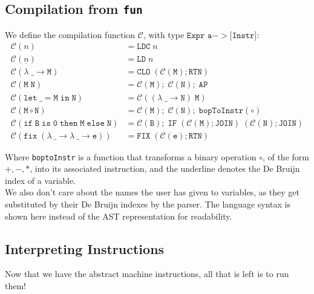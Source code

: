 \subsection{Compilation from \texttt{fun}}
We define the compilation function $ \mathcal{C} $, with type $ \texttt{Expr a} -> \texttt{[Instr]} $:
\[
\begin{aligned}
    \mathcal{C}(n) &= \mathtt{LDC}\; n \\
    \mathcal{C}(\underline{n}) &= \mathtt{LD}\; n \\
    \mathcal{C}(\mathtt{\lambda\; \_ \to M}) &= \mathtt{CLO}\; (\mathcal{C}(\mathtt{M}); \mathtt{RTN}) \\
    \mathcal{C}(\mathtt{M\; N}) &= \mathcal{C}(\mathtt{M});\; \mathcal{C}(\mathtt{N});\; \mathtt{AP} \\
    \mathcal{C}(\mathtt{let\; \_ = M\; in\; N}) & = \mathcal{C}((\lambda\; \_ \to \mathtt{N})\; \mathtt{M}) \\
    \mathcal{C}(\mathtt{M \circ N}) &= \mathcal{C}(\mathtt{M});\; \mathcal{C}(\mathtt{N});\; \mathtt{bopToInstr}(\circ) \\
    \mathcal{C}(\mathtt{if\; B\; is\; 0\; then \; M\; else \; N}) &= \mathcal{C}(\mathtt{B});\; \mathtt{IF}\; (\mathcal{C}(\mathtt{M}); \mathtt{JOIN})\; (\mathcal{C}(\mathtt{N}); \mathtt{JOIN}) \\
    \mathcal{C}(\mathtt{fix\; (\lambda \ \_ \to \lambda \ \_ \to e)}) &= \mathtt{FIX}\; (\mathcal{C}(\mathtt{e}); \mathtt{RTN})
\end{aligned}
\]

Where \texttt{boptoInstr} is a function that transforms a binary operation $\circ$, of the form $ +, -, * $, into its associated instruction, and the underline denotes
the De Bruijn index of a variable. \\
We also don't care about the names the user has given to variables, as they get substituted by their De Bruijn indexes by the parser. 
The language syntax is shown here instead of the AST representation for readability.

\subsection{Interpreting Instructions}
Now that we have the abstract machine instructions, all that is left is to run them!

